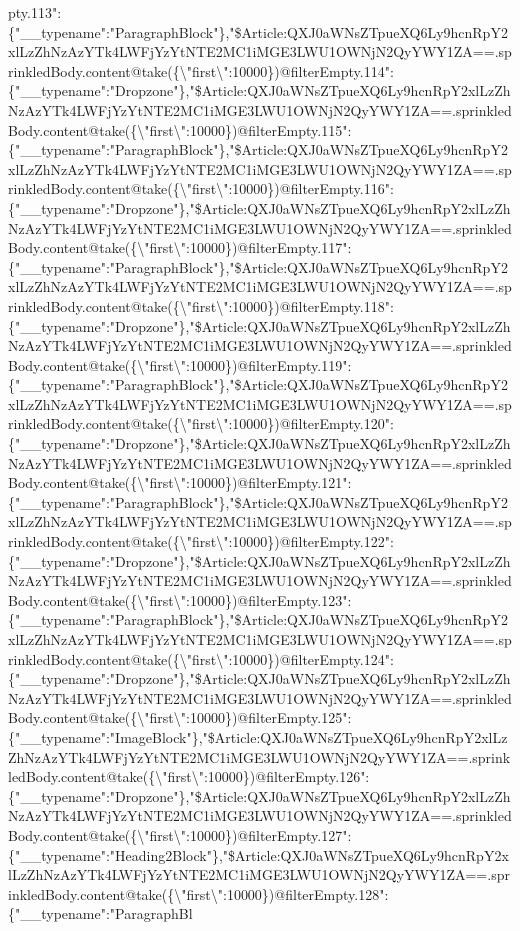 pty.113":\{"\_\_typename":"ParagraphBlock"\},"\$Article:QXJ0aWNsZTpueXQ6Ly9hcnRpY2xlLzZhNzAzYTk4LWFjYzYtNTE2MC1iMGE3LWU1OWNjN2QyYWY1ZA==.sprinkledBody.content@take(\{\textbackslash{}"first\textbackslash{}":10000\})@filterEmpty.114":\{"\_\_typename":"Dropzone"\},"\$Article:QXJ0aWNsZTpueXQ6Ly9hcnRpY2xlLzZhNzAzYTk4LWFjYzYtNTE2MC1iMGE3LWU1OWNjN2QyYWY1ZA==.sprinkledBody.content@take(\{\textbackslash{}"first\textbackslash{}":10000\})@filterEmpty.115":\{"\_\_typename":"ParagraphBlock"\},"\$Article:QXJ0aWNsZTpueXQ6Ly9hcnRpY2xlLzZhNzAzYTk4LWFjYzYtNTE2MC1iMGE3LWU1OWNjN2QyYWY1ZA==.sprinkledBody.content@take(\{\textbackslash{}"first\textbackslash{}":10000\})@filterEmpty.116":\{"\_\_typename":"Dropzone"\},"\$Article:QXJ0aWNsZTpueXQ6Ly9hcnRpY2xlLzZhNzAzYTk4LWFjYzYtNTE2MC1iMGE3LWU1OWNjN2QyYWY1ZA==.sprinkledBody.content@take(\{\textbackslash{}"first\textbackslash{}":10000\})@filterEmpty.117":\{"\_\_typename":"ParagraphBlock"\},"\$Article:QXJ0aWNsZTpueXQ6Ly9hcnRpY2xlLzZhNzAzYTk4LWFjYzYtNTE2MC1iMGE3LWU1OWNjN2QyYWY1ZA==.sprinkledBody.content@take(\{\textbackslash{}"first\textbackslash{}":10000\})@filterEmpty.118":\{"\_\_typename":"Dropzone"\},"\$Article:QXJ0aWNsZTpueXQ6Ly9hcnRpY2xlLzZhNzAzYTk4LWFjYzYtNTE2MC1iMGE3LWU1OWNjN2QyYWY1ZA==.sprinkledBody.content@take(\{\textbackslash{}"first\textbackslash{}":10000\})@filterEmpty.119":\{"\_\_typename":"ParagraphBlock"\},"\$Article:QXJ0aWNsZTpueXQ6Ly9hcnRpY2xlLzZhNzAzYTk4LWFjYzYtNTE2MC1iMGE3LWU1OWNjN2QyYWY1ZA==.sprinkledBody.content@take(\{\textbackslash{}"first\textbackslash{}":10000\})@filterEmpty.120":\{"\_\_typename":"Dropzone"\},"\$Article:QXJ0aWNsZTpueXQ6Ly9hcnRpY2xlLzZhNzAzYTk4LWFjYzYtNTE2MC1iMGE3LWU1OWNjN2QyYWY1ZA==.sprinkledBody.content@take(\{\textbackslash{}"first\textbackslash{}":10000\})@filterEmpty.121":\{"\_\_typename":"ParagraphBlock"\},"\$Article:QXJ0aWNsZTpueXQ6Ly9hcnRpY2xlLzZhNzAzYTk4LWFjYzYtNTE2MC1iMGE3LWU1OWNjN2QyYWY1ZA==.sprinkledBody.content@take(\{\textbackslash{}"first\textbackslash{}":10000\})@filterEmpty.122":\{"\_\_typename":"Dropzone"\},"\$Article:QXJ0aWNsZTpueXQ6Ly9hcnRpY2xlLzZhNzAzYTk4LWFjYzYtNTE2MC1iMGE3LWU1OWNjN2QyYWY1ZA==.sprinkledBody.content@take(\{\textbackslash{}"first\textbackslash{}":10000\})@filterEmpty.123":\{"\_\_typename":"ParagraphBlock"\},"\$Article:QXJ0aWNsZTpueXQ6Ly9hcnRpY2xlLzZhNzAzYTk4LWFjYzYtNTE2MC1iMGE3LWU1OWNjN2QyYWY1ZA==.sprinkledBody.content@take(\{\textbackslash{}"first\textbackslash{}":10000\})@filterEmpty.124":\{"\_\_typename":"Dropzone"\},"\$Article:QXJ0aWNsZTpueXQ6Ly9hcnRpY2xlLzZhNzAzYTk4LWFjYzYtNTE2MC1iMGE3LWU1OWNjN2QyYWY1ZA==.sprinkledBody.content@take(\{\textbackslash{}"first\textbackslash{}":10000\})@filterEmpty.125":\{"\_\_typename":"ImageBlock"\},"\$Article:QXJ0aWNsZTpueXQ6Ly9hcnRpY2xlLzZhNzAzYTk4LWFjYzYtNTE2MC1iMGE3LWU1OWNjN2QyYWY1ZA==.sprinkledBody.content@take(\{\textbackslash{}"first\textbackslash{}":10000\})@filterEmpty.126":\{"\_\_typename":"Dropzone"\},"\$Article:QXJ0aWNsZTpueXQ6Ly9hcnRpY2xlLzZhNzAzYTk4LWFjYzYtNTE2MC1iMGE3LWU1OWNjN2QyYWY1ZA==.sprinkledBody.content@take(\{\textbackslash{}"first\textbackslash{}":10000\})@filterEmpty.127":\{"\_\_typename":"Heading2Block"\},"\$Article:QXJ0aWNsZTpueXQ6Ly9hcnRpY2xlLzZhNzAzYTk4LWFjYzYtNTE2MC1iMGE3LWU1OWNjN2QyYWY1ZA==.sprinkledBody.content@take(\{\textbackslash{}"first\textbackslash{}":10000\})@filterEmpty.128":\{"\_\_typename":"ParagraphBl